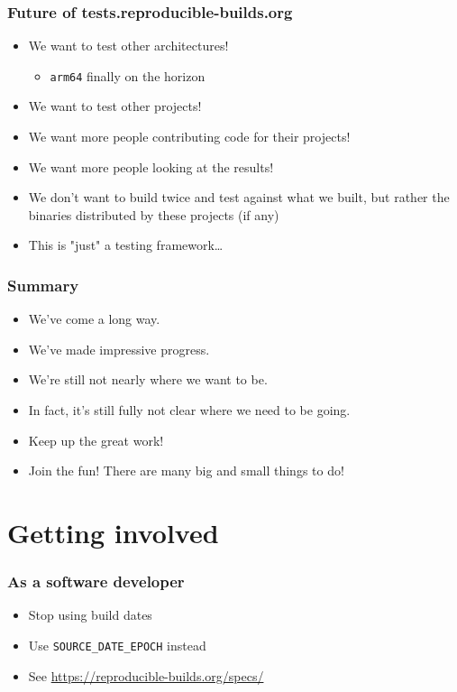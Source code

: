 \documentclass[14pt,aspectratio=169]{beamer}
\begin{document}
\begin{frame}
 \frametitle{Future of tests.reproducible-builds.org}

 \begin{itemize}
 \item We want to test other architectures!
  \begin{itemize}
   \item \texttt{arm64} finally on the horizon
  \end{itemize}
 \item We want to test other projects!
 \item We want more people contributing code for their projects!
 \item We want more people looking at the results!
 \item We don't want to build twice and test against what we built, but rather
 the binaries distributed by these projects (if any)
 \item<2> This is "just" a testing framework…
\end{itemize}
\end{frame}

\begin{frame}
 \frametitle{Summary}
 \begin{itemize}
  \item We've come a long way.
  \item We've made impressive progress.
  \item We're still not nearly where we want to be.
  \item<2-3> In fact, it's still fully not clear where we need to be going.
  \item<3> Keep up the great work!
  \item<3> Join the fun! There are many big and small things to do!
 \end{itemize}
\end{frame}


\section{Getting involved}

\begin{frame}
 \frametitle{As a software developer}
 \begin{itemize}
  \item Stop using build dates
  \item Use \texttt{SOURCE\_DATE\_EPOCH} instead
  \item See \url{https://reproducible-builds.org/specs/}
 \end{itemize}
\end{frame}
\end{document}
